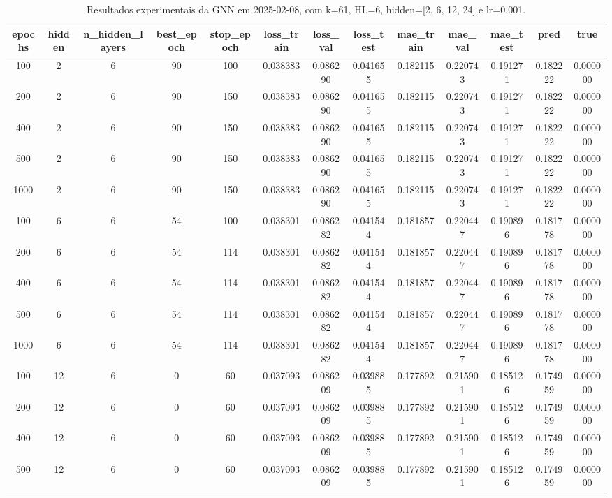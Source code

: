 \begin{table}[h]
\centering
\caption{Resultados experimentais da GNN em 2025-02-08, com k=61, HL=6, hidden=[2, 6, 12, 24] e lr=0.001.}
\label{tab:gnn_results_k61_hl6_d20250208}
\begin{tabular}{ccccccccccccc}
\toprule
epochs & hidden & n\_hidden\_layers & best\_epoch & stop\_epoch & loss\_train & loss\_val & loss\_test & mae\_train & mae\_val & mae\_test & pred & true \\
\midrule
100 & 2 & 6 & 90 & 100 & 0.038383 & 0.086290 & 0.041655 & 0.182115 & 0.220743 & 0.191271 & 0.182222 & 0.000000 \\
200 & 2 & 6 & 90 & 150 & 0.038383 & 0.086290 & 0.041655 & 0.182115 & 0.220743 & 0.191271 & 0.182222 & 0.000000 \\
400 & 2 & 6 & 90 & 150 & 0.038383 & 0.086290 & 0.041655 & 0.182115 & 0.220743 & 0.191271 & 0.182222 & 0.000000 \\
500 & 2 & 6 & 90 & 150 & 0.038383 & 0.086290 & 0.041655 & 0.182115 & 0.220743 & 0.191271 & 0.182222 & 0.000000 \\
1000 & 2 & 6 & 90 & 150 & 0.038383 & 0.086290 & 0.041655 & 0.182115 & 0.220743 & 0.191271 & 0.182222 & 0.000000 \\
100 & 6 & 6 & 54 & 100 & 0.038301 & 0.086282 & 0.041544 & 0.181857 & 0.220447 & 0.190896 & 0.181778 & 0.000000 \\
200 & 6 & 6 & 54 & 114 & 0.038301 & 0.086282 & 0.041544 & 0.181857 & 0.220447 & 0.190896 & 0.181778 & 0.000000 \\
400 & 6 & 6 & 54 & 114 & 0.038301 & 0.086282 & 0.041544 & 0.181857 & 0.220447 & 0.190896 & 0.181778 & 0.000000 \\
500 & 6 & 6 & 54 & 114 & 0.038301 & 0.086282 & 0.041544 & 0.181857 & 0.220447 & 0.190896 & 0.181778 & 0.000000 \\
1000 & 6 & 6 & 54 & 114 & 0.038301 & 0.086282 & 0.041544 & 0.181857 & 0.220447 & 0.190896 & 0.181778 & 0.000000 \\
100 & 12 & 6 & 0 & 60 & 0.037093 & 0.086209 & 0.039885 & 0.177892 & 0.215901 & 0.185126 & 0.174959 & 0.000000 \\
200 & 12 & 6 & 0 & 60 & 0.037093 & 0.086209 & 0.039885 & 0.177892 & 0.215901 & 0.185126 & 0.174959 & 0.000000 \\
400 & 12 & 6 & 0 & 60 & 0.037093 & 0.086209 & 0.039885 & 0.177892 & 0.215901 & 0.185126 & 0.174959 & 0.000000 \\
500 & 12 & 6 & 0 & 60 & 0.037093 & 0.086209 & 0.039885 & 0.177892 & 0.215901 & 0.185126 & 0.174959 & 0.000000 \\

\end{tabular}
\end{table}
